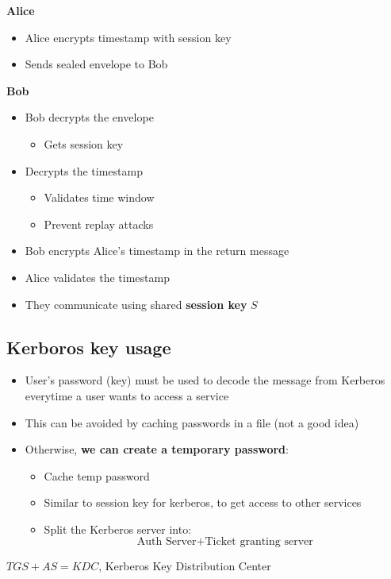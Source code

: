 \documentclass{easyclass}
\begin{document}
\begin{lem}{}
    \textbf{Alice}
    \begin{itemize}
        \item Alice encrypts timestamp with session key
        \item Sends sealed envelope to Bob
    \end{itemize}
    \textbf{Bob}
    \begin{itemize}
        \item Bob decrypts the envelope
        \begin{itemize}
            \item Gets session key
        \end{itemize}
        \item Decrypts the timestamp
        \begin{itemize}
            \item Validates time window
            \item Prevent replay attacks
        \end{itemize}
    \end{itemize}
\end{lem}

\begin{lem}{}
    \begin{itemize}
        \item Bob encrypts Alice's timestamp in the return message
        \item Alice validates the timestamp
        \item They communicate using shared \textbf{session key} $S$
    \end{itemize}
\end{lem}
\subsection{Kerboros key usage}
\begin{theo}{}
    \begin{itemize}
        \item User’s password (key) must be used to decode the message from Kerberos everytime
        a user wants to access a service
        \item This can be avoided by caching passwords in a file (not a good idea)
        \item Otherwise, \textbf{we can create a temporary password}:
        \begin{itemize}
            \item Cache temp password
            \item Similar to session key for kerberos, to get access to other services
            \item Split the Kerberos server into:
            \[\text{Auth Server} + \text{Ticket granting server}\]
        \end{itemize}
    \end{itemize}
    \begin{definition}{}
        $TGS + AS = KDC$, Kerberos Key Distribution Center
    \end{definition}
\end{theo}
\end{document}
